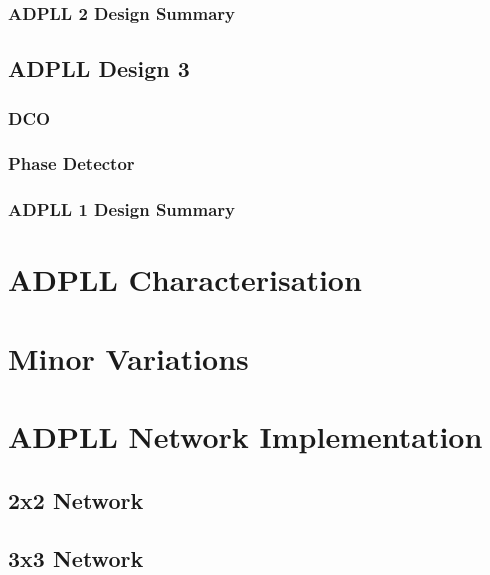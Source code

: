 \subsubsection{\acs{ADPLL} 2 Design Summary}

\subsection{\acs{ADPLL} Design 3}
\subsubsection{\acl{DCO}}
\subsubsection{Phase Detector}
\subsubsection{\acs{ADPLL} 1 Design Summary}


\section{\acs{ADPLL} Characterisation}

\section{Minor Variations}\label{section:minor_variations}

\section{\acs{ADPLL} Network Implementation}
\subsection{2x2 Network}
\subsection{3x3 Network}
